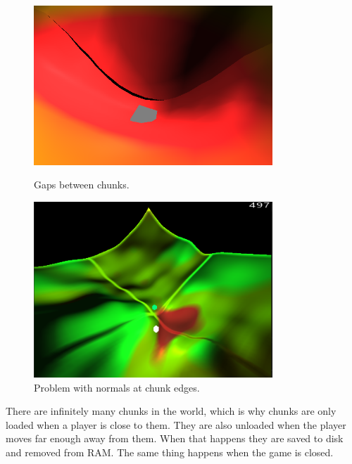 \begin{figure}[h]
    \centering
    \begin{minipage}{0.45\textwidth}
        \centering
        \includegraphics[width=0.8\textwidth]{chapters/implementation/sections/terrain/resources/chunk_edges_gaps.png}
        \caption{Gaps between chunks.}
        \label{fig:gaps_between_chunks}
    \end{minipage}\hfill
    \begin{minipage}{0.45\textwidth}
        \centering
        \includegraphics[width=0.8\textwidth]{chapters/implementation/sections/terrain/resources/chunk_edges_normals_problem.png}
        \caption{Problem with normals at chunk edges.}
        \label{fig:problem_with_normals_at_chunk_edge}
    \end{minipage}
\end{figure}

There are infinitely many chunks in the world, which is why chunks are only loaded when a player is close to them.
They are also unloaded when the player moves far enough away from them.
When that happens they are saved to disk and removed from RAM.
The same thing happens when the game is closed.